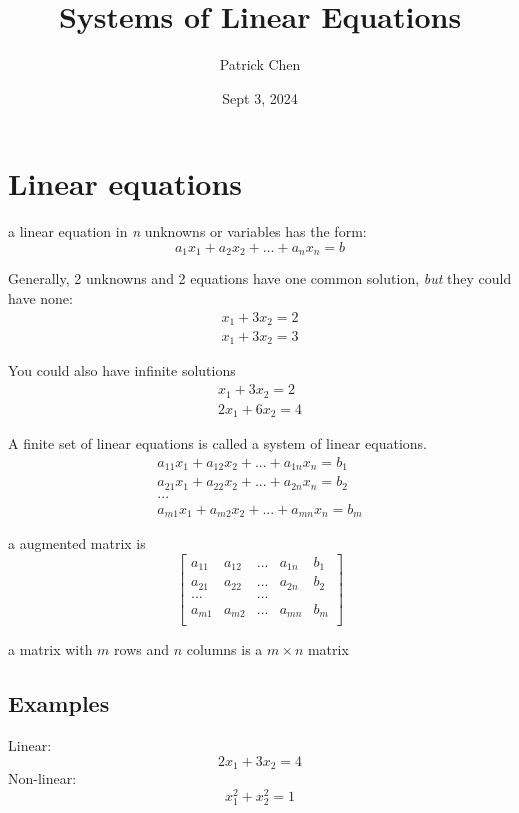 \documentclass{article}
\title{Systems of Linear Equations}
\author{Patrick Chen}
\date{Sept 3, 2024}
\theoremstyle{mytheoremstyle}
\theoremstyle{mytheoremstyle}
\theoremstyle{myproblemstyle}
\begin{document}
    \maketitle

    \section*{Linear equations}
    a linear equation in \textit{n} unknowns or variables has the form:
    \begin{equation*}
        a_1x_1+a_2x_2+...+a_nx_n=b
    \end{equation*}

    Generally, 2 unknowns and 2 equations have one common solution, \textit{but} they could have none:
    \begin{align*}
        x_1+3x_2=2\\
        x_1+3x_2=3
    \end{align*}

    You could also have infinite solutions
    \begin{align*}
        x_1+3x_2=2\\
        2x_1+6x_2=4
    \end{align*}

    A finite set of linear equations is called a system of linear equations.
    \begin{align*}
        a_{11}x_1+a_{12}x_2+...+a_{1n}x_n=b_1\\
        a_{21}x_1+a_{22}x_2+...+a_{2n}x_n=b_2\\
        ...\\
        a_{m1}x_1+a_{m2}x_2+...+a_{mn}x_n=b_m
    \end{align*}

    a augmented matrix is
    \begin{equation*}
        \begin{bmatrix}
            a_{11} & a_{12} & ... & a_{1n} & b_1\\
            a_{21} & a_{22} & ... & a_{2n} & b_2\\
            ... &  & ... & & \\
            a_{m1} & a_{m2} & ... & a_{mn} & b_m\\
        \end{bmatrix}
    \end{equation*}

    a matrix with $m$ rows and $n$ columns is a $m\times n$ matrix

    \subsection*{Examples}
    Linear:
    \begin{equation*}
        2x_1+3x_2=4
    \end{equation*}
    Non-linear:
    \begin{equation*}
        x_1^2+x_2^2=1
    \end{equation*}
\end{document}
